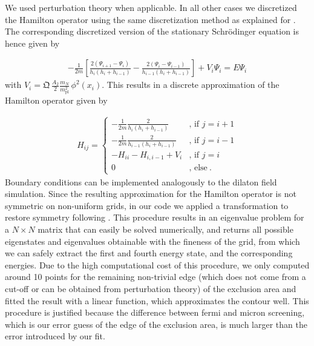 \documentclass[aps,pra,twocolumn,floatfix,superscriptaddress,nofootinbib,showpacs,a4paper,balancelastpage,twoside]{revtex4-2}
\newcommand{\cannex}{{\sc{Cannex}}}				%
\begin{document}
We used perturbation theory when applicable. In all other cases we discretized the Hamilton operator using the same discretization method as explained for \cannex{}. The corresponding discretized version of the stationary Schr\"odinger equation is hence given by

\begin{align}
-\frac{1}{2m}\left[\frac{2(\Psi_{i+1}-\Psi_{i})}{h_i(h_i+h_{i-1})}-\frac{2(\Psi_{i}-\Psi_{i-1})}{h_{i-1}(h_i+h_{i-1})}\right] + V_i\Psi_{i} = E \Psi_{i} \label{FDS}
\end{align}
with $\displaystyle V_i = \mathfrak{Q}\,\frac{A_2}{2}\frac{m_N}{m_{\text{pl}}^2}\,\phi^2(x_i)$.
 This results in a discrete approximation of the Hamilton operator given by

\begin{align}
H_{ij} = \begin{cases}
      -\displaystyle\frac{1}{2m} \frac{2}{h_i(h_i+h_{i-1})} &\text{, if } j = i+1\\
     \displaystyle-\frac{1}{2m} \frac{2}{h_{i-1}(h_i+h_{i-1})} &\text{, if } j = i-1\\
     -H_{ii} - H_{i,i-1} + V_i&\text{, if } j = i \\
     0 &\text{, else}\>.
    \end{cases} 
\end{align}
 Boundary conditions can be implemented analogously to the dilaton field simulation. Since the resulting approximation for the Hamilton operator is not symmetric on non-uniform grids, in our code we applied a transformation to restore symmetry following \cite{tan1990self}. This procedure results in an eigenvalue problem for a $N \times N$ matrix that can easily be solved numerically, and returns all possible eigenstates and eigenvalues obtainable with the fineness of the grid, from which we can safely extract the first and fourth energy state, and the corresponding energies. Due to the high computational cost of this procedure, we only computed around 10 points for the remaining non-trivial edge (which does not come from a cut-off or can be obtained from perturbation theory) of the exclusion area and fitted the result with a linear function, which approximates the contour well. This procedure is justified because the difference between fermi and micron screening, which is our error guess of the edge of the exclusion area, is much larger than the error introduced by our fit.


\end{document}
